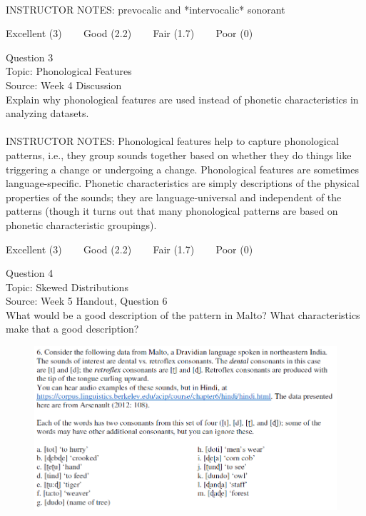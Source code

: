 \documentclass[12pt]{article}
\begin{document}
~\\
INSTRUCTOR NOTES: prevocalic and *intervocalic* sonorant


\vfill
Excellent (3) ~~~ Good (2.2) ~~~ Fair (1.7) ~~~ Poor (0)
\newpage

{\large Question 3}\\

Topic: Phonological Features\\
Source: Week 4 Discussion\\

Explain why phonological features are used instead of phonetic characteristics in analyzing datasets.\\


~\\
INSTRUCTOR NOTES: Phonological features help to capture phonological patterns, i.e., they group sounds together based on whether they do things like triggering a change or undergoing a change. Phonological features are sometimes language-specific. Phonetic characteristics are simply descriptions of the physical properties of the sounds; they are language-universal and independent of the patterns (though it turns out that many phonological patterns are based on phonetic characteristic groupings).


\vfill
Excellent (3) ~~~ Good (2.2) ~~~ Fair (1.7) ~~~ Poor (0)
\newpage

{\large Question 4}\\

Topic: Skewed Distributions\\
Source: Week 5 Handout, Question 6\\

What would be a good description of the pattern in Malto? What characteristics make that a good description?\\

\begin{figure}[H]
\includegraphics{../images/malto.png}
\end{figure}
\end{document}
